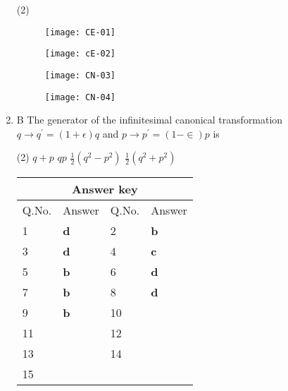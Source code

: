 \begin{enumerate}
	 \begin{tasks}(2)
		\task[\textbf{a.}]
		\begin{figure}[H]
			\centering
			\texttt{[image: CE-01]}
		\end{figure}
		\task[\textbf{b.}]	\begin{figure}[H]
			\centering
			\texttt{[image: cE-02]}
		\end{figure}
		\task[\textbf{c.}]
		\begin{figure}[H]
			\centering
			\texttt{[image: CN-03]}
		\end{figure}
		\task[\textbf{d.}] \begin{figure}[H]
			\centering
			\texttt{[image: CN-04]}
		\end{figure}
	\end{tasks}
	\item B The generator of the infinitesimal canonical transformation $q \rightarrow q^{\prime}=(1+\epsilon) q$ and $p \rightarrow p^{\prime}=(1-\in) p$ is
{}
	 \begin{tasks}(2)
		\task[\textbf{a.}] $q+p$
		\task[\textbf{b.}]$q p$
		\task[\textbf{c.}]$\frac{1}{2}\left(q^{2}-p^{2}\right)$
		\task[\textbf{d.}] $\frac{1}{2}\left(q^{2}+p^{2}\right)$
	\end{tasks}
	\setlength\arrayrulewidth{1pt}
	\begin{table}[H]
		\centering
		\begin{tabular}{|p{1.5cm}|p{1.5cm}||p{1.5cm}|p{1.5cm}|}
			\hline
			\multicolumn{4}{|c|}{\textbf{Answer key}}\\\hline\hline
			\rowcolor{ocrel}Q.No.&Answer&Q.No.&Answer\\\hline
			1&\textbf{d} &2&\textbf{b}\\\hline 
			3&\textbf{d} &4&\textbf{c} \\\hline
			5&\textbf{b} &6&\textbf{d} \\\hline
			7&\textbf{b}&8&\textbf{d}\\\hline
			9&\textbf{b}&10&\textbf{}\\\hline
			11&\textbf{} &12&\textbf{}\\\hline
			13&\textbf{}&14&\textbf{}\\\hline
			15&\textbf{}& &\\\hline
			
		\end{tabular}
	\end{table}
\end{enumerate}

